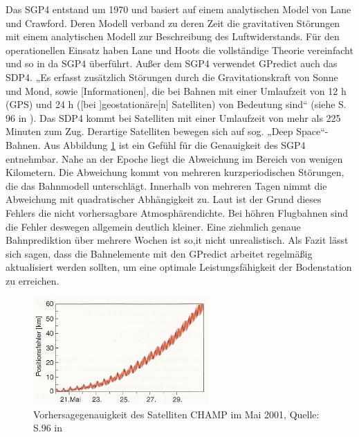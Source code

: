 Das \ac{SGP4} entstand um 1970 und basiert auf einem analytischen Model von Lane und Crawford. Deren Modell verband zu deren Zeit die gravitativen Störungen mit einem analytischen Modell zur Beschreibung des Luftwiderstands. Für den operationellen Einsatz haben Lane und Hoots die vollständige Theorie vereinfacht und so in da \ac{SGP4} überführt. 
\newpar
Außer dem \ac{SGP4} verwendet  GPredict auch das \ac{SDP4}. „Es erfasst zusätzlich Störungen durch die Gravitationskraft von Sonne und Mond, sowie [Informationen], die bei Bahnen mit einer Umlaufzeit von 12 h (GPS) und 24 h ([bei ]geostationäre[n] Satelliten) von Bedeutung sind“ (siehe S. 96 in \cite{HandRaum}). Das \ac{SDP4} kommt bei Satelliten mit einer Umlaufzeit von mehr als 225 Minuten zum Zug. Derartige Satelliten bewegen sich auf sog. „Deep Space“-Bahnen. 
\newpar
Aus Abbildung \ref{fig:sgp4} ist ein Gefühl für die Genauigkeit des \ac{SGP4} entnehmbar. Nahe an der Epoche liegt die Abweichung im Bereich von wenigen Kilometern. Die Abweichung kommt von mehreren kurzperiodischen Störungen, die das Bahnmodell unterschlägt. Innerhalb von mehreren Tagen nimmt die Abweichung mit quadratischer Abhängigkeit zu. Laut \cite{HandRaum} ist der Grund dieses Fehlers die nicht vorhersagbare Atmosphärendichte. Bei höhren Flugbahnen sind die Fehler deswegen allgemein deutlich kleiner. Eine ziehmlich genaue Bahnprediktion über mehrere Wochen ist so,it nicht unrealistisch. Als Fazit lässt sich sagen, dass die Bahnelemente mit den GPredict arbeitet regelmäßig aktualisiert werden sollten, um eine optimale Leistungsfähigkeit der Bodenstation zu erreichen.  
\begin{figure}[h]                                                                           %
	\centering                                                                            	%
	\includegraphics[width=0.6\textwidth]{./images/sgp4_error.jpg}              			%
	\caption[Vorhersagegenauigkeit]{Vorhersagegenauigkeit des Satelliten CHAMP 
	im Mai 2001, Quelle: S.96 in \cite{HandRaum}}                        					%
	\label{fig:sgp4}                                                                        %
\end{figure}                                                                              	%

